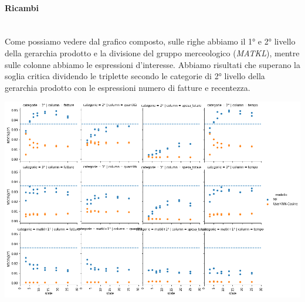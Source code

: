 \paragraph{Ricambi}\mbox{} \\
Come possiamo vedere dal grafico composto, sulle righe abbiamo il 1° e 2° livello della gerarchia prodotto e la divisione del gruppo merceologico (\textit{MATKL}), mentre sulle colonne abbiamo le espressioni d'interesse. Abbiamo risultati che superano la soglia critica dividendo le triplette secondo le categorie di 2° livello della gerarchia prodotto con le espressioni numero di fatture e recentezza.
\begin{center}
\includegraphics[width=16cm]{figures/risultati_minmax_categoria_ricambi.png}
\label{tab:minmax_ricambi}
\end{center}


